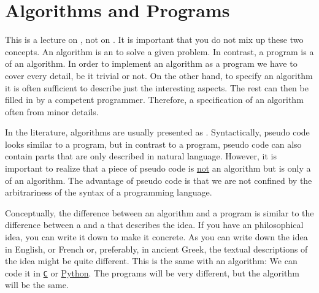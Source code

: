 \section{Algorithms and Programs}
This is a lecture on , not on .  It is important that you do not mix up
these two concepts.  An algorithm  is an  to solve a given problem.  In
contrast, a program is a  of an algorithm.  In order to implement an
algorithm as a program we have to cover every detail, be it trivial or not.  On the other hand, 
to specify an algorithm it is often sufficient to describe just the interesting aspects.  The rest can then be
filled in by a competent programmer.  Therefore, a specification of an algorithm often  from minor
details. 

In the literature, algorithms are usually presented as . 
Syntactically, pseudo code looks
similar to a program, but in contrast to a program, pseudo code can also contain parts that are only
described in natural language.   However, it is important to realize that a piece of pseudo code is
\underline{not} an algorithm but is only a  of an algorithm.  The
advantage of pseudo code is that we are not confined by the arbitrariness of the syntax of a
programming language.

Conceptually, the difference between an algorithm and a program is similar to the difference between
a  and a  that describes the idea.  If you have an philosophical idea, you
can write it down to make it concrete.  As you can write down the idea in English, or French or, preferably, in
ancient Greek, the textual descriptions of the idea might be quite different.  This is the same with an algorithm:
We can code it in \href{https://en.wikipedia.org/wiki/C_(programming_language)}{\texttt{C}} or
\href{http://python.org}{Python}.  The programs will be very different, but the algorithm will be the same. 


